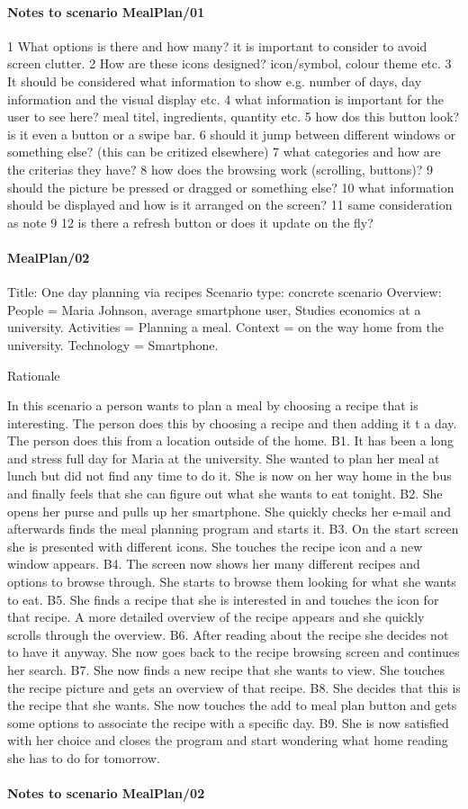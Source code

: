 \paragraph{Notes to scenario MealPlan/01}
1 What options is there and how many? it is important to consider to avoid screen clutter.
2 How are these icons designed? icon/symbol, colour theme etc.
3 It should be considered what information to show e.g. number of days, day information and the visual display etc.
4 what information is important for the user to see here? meal titel, ingredients, quantity etc.
5 how dos this button look? is it even a button or a swipe bar.
6 should it jump between different windows or something else? (this can be critized elsewhere)
7 what categories and how are the criterias they have?
8 how does the browsing work (scrolling, buttons)?
9 should the picture be pressed or dragged or something else?
10 what information should be displayed and how is it arranged on the screen?
11 same consideration as note 9
12 is there a refresh button or does it update on the fly?

\paragraph{MealPlan/02}
Title: One day planning via recipes
Scenario type: concrete scenario
Overview:
	People = Maria Johnson, average smartphone user, Studies economics at a university. 
	Activities = Planning a meal.
	Context = on the way home from the university.
	Technology = Smartphone.

Rationale

In this scenario a person wants to plan a meal by choosing a recipe that is interesting. The person does this by choosing a recipe and then adding it t a day. The person does this from a location outside of the home. 
	B1. It has been a long and stress full day for Maria at the university. She wanted to plan her meal at lunch but did not find any time to do it. She is now on her way home in the bus and finally feels that she can figure out what she wants to eat tonight.
	B2. She opens her purse and pulls up her smartphone. She quickly checks her e-mail and afterwards finds the meal planning program and starts it. 
	B3. On the start screen she is presented with different icons. She touches the recipe icon and a new window appears.
	B4. The screen now shows her many different recipes and options to browse through. She starts to browse them looking for what she wants to eat. 
	B5. She finds a recipe that she is interested in and touches the icon for that recipe. A more detailed overview of the recipe appears and she quickly scrolls through the overview.
	B6. After reading about the recipe she decides not to have it anyway. She now goes back to the recipe browsing screen and continues her search.
	B7. She now finds a new recipe that she wants to view. She touches the recipe picture and gets an overview of that recipe. 
	B8. She decides that this is the recipe that she wants. She now touches the add to meal plan button and gets some options to associate the recipe with a specific day.
	B9. She is now satisfied with her choice and closes the program and start wondering what home reading she has to do for tomorrow.
	
\paragraph{Notes to scenario MealPlan/02}   